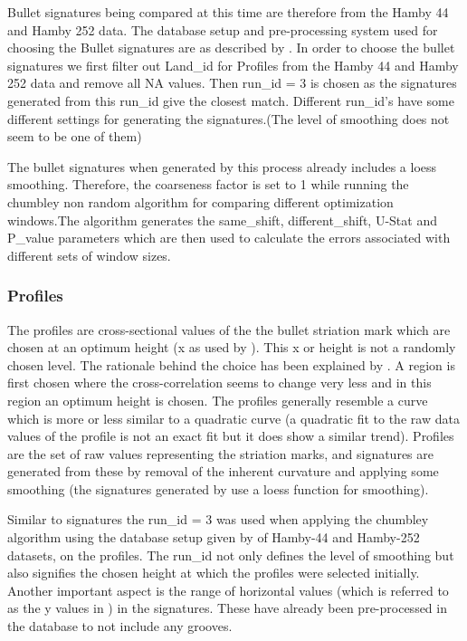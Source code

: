 \documentclass[12pt]{article}
\begin{document}
Bullet signatures being compared at this time are therefore from the
Hamby 44 and Hamby 252 data. The database setup and pre-processing
system used for choosing the Bullet signatures are as described by
\citet{aoas}. In order to choose the bullet signatures we first filter
out Land\_id for Profiles from the Hamby 44 and Hamby 252 data and
remove all NA values. Then run\_id = 3 is chosen as the signatures
generated from this run\_id give the closest match. Different run\_id's
have some different settings for generating the signatures.(The level of
smoothing does not seem to be one of them)

The bullet signatures when generated by this process already includes a
loess smoothing. Therefore, the coarseness factor is set to 1 while
running the chumbley non random algorithm for comparing different
optimization windows.The algorithm generates the same\_shift,
different\_shift, U-Stat and P\_value parameters which are then used to
calculate the errors associated with different sets of window sizes.

\subsubsection{Profiles}\label{profiles}

The profiles are cross-sectional values of the the bullet striation mark
which are chosen at an optimum height (x as used by \citet{aoas}). This
x or height is not a randomly chosen level. The rationale behind the
choice has been explained by \citet{aoas}. A region is first chosen
where the cross-correlation seems to change very less and in this region
an optimum height is chosen. The profiles generally resemble a curve
which is more or less similar to a quadratic curve (a quadratic fit to
the raw data values of the profile is not an exact fit but it does show
a similar trend). Profiles are the set of raw values representing the
striation marks, and signatures are generated from these by removal of
the inherent curvature and applying some smoothing (the signatures
generated by \citet{aoas} use a loess function for smoothing).

Similar to signatures the run\_id = 3 was used when applying the
chumbley algorithm using the database setup given by \citet{aoas} of
Hamby-44 and Hamby-252 datasets, on the profiles. The run\_id not only
defines the level of smoothing but also signifies the chosen height at
which the profiles were selected initially. Another important aspect is
the range of horizontal values (which is referred to as the y values in
\citet{aoas}) in the signatures. These have already been pre-processed
in the database to not include any grooves.
\end{document}
